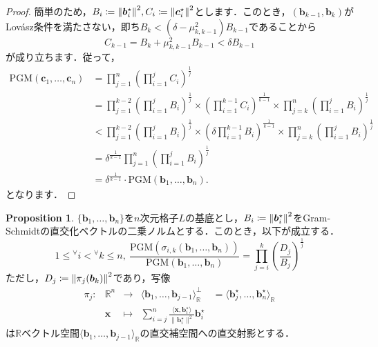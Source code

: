 \documentclass[a4j, dvipdfmx]{jsarticle}
\theoremstyle{definition}
\newtheorem{proposition}[definition]{Proposition}
\begin{document}
\begin{proof}
簡単のため，$B_i\coloneqq \norm{\boldsymbol{b}_i^\star}^2, C_i\coloneqq \norm{\boldsymbol{c}_i^\star}^2$とします．このとき，$(\boldsymbol{b}_{k-1},\boldsymbol{b}_k)$がLovász条件を満たさない，即ち$B_k<(\delta-\mu_{k, k-1}^2)B_{k-1}$であることから
$$
C_{k-1}=B_k+\mu_{k, k-1}^2B_{k-1}<\delta B_{k-1}
$$
が成り立ちます．従って，
$$
\begin{aligned}
\mathrm{PGM}(\boldsymbol{c}_1,\ldots,\boldsymbol{c}_n)&=\prod_{j=1}^n \left(\prod_{i=1}^j C_i\right)^\frac{1}{j}\\
&=\prod_{j=1}^{k-2} \left(\prod_{i=1}^j B_i\right)^\frac{1}{j}\times \left(\prod_{i=1}^{k-1} C_i\right)^\frac{1}{k-1}\times \prod_{j=k}^n \left(\prod_{i=1}^j B_i\right)^\frac{1}{j}\\
&< \prod_{j=1}^{k-2} \left(\prod_{i=1}^j B_i\right)^\frac{1}{j}\times \left(\delta\prod_{i=1}^{k-1} B_i\right)^\frac{1}{k-1}\times \prod_{j=k}^n \left(\prod_{i=1}^j B_i\right)^\frac{1}{j}\\
&=\delta^{\frac{1}{k-1}}\prod_{j=1}^n \left(\prod_{i=1}^j B_i\right)^\frac{1}{j}\\
&=\delta^{\frac{1}{k-1}}\cdot\mathrm{PGM}(\boldsymbol{b}_1,\ldots,\boldsymbol{b}_n).
\end{aligned}
$$
となります．
\end{proof}

\begin{proposition}
$\{\boldsymbol{b}_1,\ldots,\boldsymbol{b}_n\}$を$n$次元格子$L$の基底とし，$B_i\coloneqq \norm{\boldsymbol{b}_i^\star}^2$をGram-Schmidtの直交化ベクトルの二乗ノルムとする．このとき，以下が成立する．
$$
1\le{}^\forall i<{}^\forall k\le n,~\frac{\mathrm{PGM}(\sigma_{i, k}(\boldsymbol{b}_1,\ldots,\boldsymbol{b}_n))}{\mathrm{PGM}(\boldsymbol{b}_1,\ldots,\boldsymbol{b}_n)}=\prod_{j=i}^k \left(\frac{D_j}{B_j}\right)^\frac{1}{j}
$$
ただし，$D_j\coloneqq \norm{\pi_j(\boldsymbol{b}_k)}^2$であり，写像
$$
\begin{array}{llclc}
\pi_j : &\mathbb{R}^n &\longrightarrow &\langle \boldsymbol{b}_1, \dots, \boldsymbol{b}_{j-1} \rangle_\mathbb{R}^\perp&=\langle \boldsymbol{b}_j^\star, \dots, \boldsymbol{b}_n^\star \rangle_\mathbb{R}\\
&\boldsymbol{x} &\longmapsto &\displaystyle\sum_{i = j}^n \frac{\langle \boldsymbol{x}, \boldsymbol{b}_i^\star \rangle}{ \| \boldsymbol{b}_i^\star \|^2 } \boldsymbol{b}_i^\star
\end{array}
$$
は$\mathbb{R}$ベクトル空間$\langle \boldsymbol{b}_1, \dots, \boldsymbol{b}_{j-1} \rangle_\mathbb{R}$の直交補空間への直交射影とする．
\end{proposition}
\end{document}
